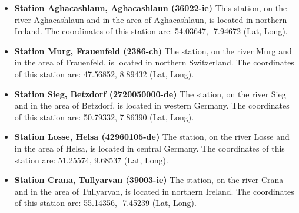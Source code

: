 \begin{itemize}
    \item \textbf{Station Aghacashlaun, Aghacashlaun (36022-ie)} \newline
    This station, on the river Aghacashlaun and in the area of Aghacashlaun, is located in northern Ireland. The coordinates of this station are: 54.03647, -7.94672 (\ac{Lat}, \ac{Long}). \cite{StationAghacashlaunAghacashlaun}
    \item \textbf{Station Murg, Frauenfeld (2386-ch)} \newline
    The station, on the river Murg and in the area of Frauenfeld, is located in northern Switzerland. The coordinates of this station are: 47.56852, 8.89432 (\ac{Lat}, \ac{Long}). \cite{StationMurgFrauenfeld}
    \item \textbf{Station Sieg, Betzdorf (2720050000-de)} \newline
    The station, on the river Sieg and in the area of Betzdorf, is located in western Germany. The coordinates of this station are: 50.79332, 7.86390 (\ac{Lat}, \ac{Long}). \cite{StationSiegBetzdorf}
    \item \textbf{Station Losse, Helsa (42960105-de)} \newline
    The station, on the river Losse and in the area of Helsa, is located in central Germany. The coordinates of this station are: 51.25574, 9.68537 (\ac{Lat}, \ac{Long}). \cite{StationLosseHelsa}
    \item \textbf{Station Crana, Tullyarvan (39003-ie)} \newline
    The station, on the river Crana and in the area of Tullyarvan, is located in northern Ireland. The coordinates of this station are: 55.14356, -7.45239 (\ac{Lat}, \ac{Long}). \cite{StationCranaTullyarvan}
    
\end{itemize}


